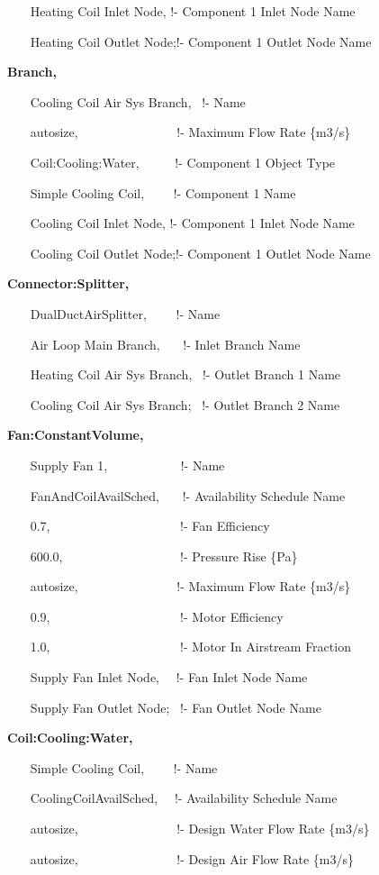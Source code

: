 ~~~ Heating Coil Inlet Node, !- Component 1 Inlet Node Name

~~~ Heating Coil Outlet Node;!- Component 1 Outlet Node Name

\textbf{Branch,}

~~~ Cooling Coil Air Sys Branch,~ !- Name

~~~ autosize,~~~~~~~~~~~~~~~ !- Maximum Flow Rate \{m3/s\}

~~~ Coil:Cooling:Water,~~~~~ !- Component 1 Object Type

~~~ Simple Cooling Coil,~~~~ !- Component 1 Name

~~~ Cooling Coil Inlet Node, !- Component 1 Inlet Node Name

~~~ Cooling Coil Outlet Node;!- Component 1 Outlet Node Name

\textbf{Connector:Splitter,}

~~~ DualDuctAirSplitter,~~~~ !- Name

~~~ Air Loop Main Branch,~~~ !- Inlet Branch Name

~~~ Heating Coil Air Sys Branch,~ !- Outlet Branch 1 Name

~~~ Cooling Coil Air Sys Branch;~ !- Outlet Branch 2 Name

\textbf{Fan:ConstantVolume,}

~~~ Supply Fan 1,~~~~~~~~~~~ !- Name

~~~ FanAndCoilAvailSched,~~~ !- Availability Schedule Name

~~~ 0.7,~~~~~~~~~~~~~~~~~~~~ !- Fan Efficiency

~~~ 600.0,~~~~~~~~~~~~~~~~~~ !- Pressure Rise \{Pa\}

~~~ autosize,~~~~~~~~~~~~~~~ !- Maximum Flow Rate \{m3/s\}

~~~ 0.9,~~~~~~~~~~~~~~~~~~~~ !- Motor Efficiency

~~~ 1.0,~~~~~~~~~~~~~~~~~~~~ !- Motor In Airstream Fraction

~~~ Supply Fan Inlet Node,~~ !- Fan Inlet Node Name

~~~ Supply Fan Outlet Node;~ !- Fan Outlet Node Name

\textbf{Coil:Cooling:Water,}

~~~ Simple Cooling Coil,~~~~ !- Name

~~~ CoolingCoilAvailSched,~~ !- Availability Schedule Name

~~~ autosize,~~~~~~~~~~~~~~~ !- Design Water Flow Rate \{m3/s\}

~~~ autosize,~~~~~~~~~~~~~~~ !- Design Air Flow Rate \{m3/s\}

